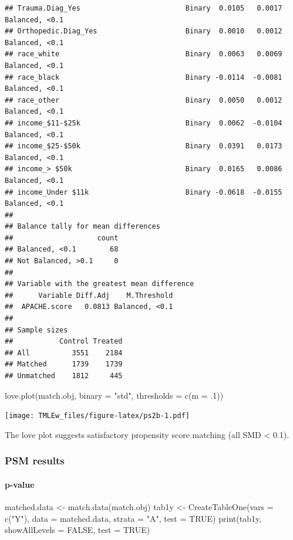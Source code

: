\documentclass[
]{book}
\newenvironment{Shaded}{\begin{snugshade}}{\end{snugshade}}
\newcommand{\AttributeTok}[1]{\textcolor[rgb]{0.77,0.63,0.00}{#1}}
\newcommand{\ConstantTok}[1]{\textcolor[rgb]{0.00,0.00,0.00}{#1}}
\newcommand{\DecValTok}[1]{\textcolor[rgb]{0.00,0.00,0.81}{#1}}
\newcommand{\FunctionTok}[1]{\textcolor[rgb]{0.00,0.00,0.00}{#1}}
\newcommand{\NormalTok}[1]{#1}
\newcommand{\OtherTok}[1]{\textcolor[rgb]{0.56,0.35,0.01}{#1}}
\newcommand{\StringTok}[1]{\textcolor[rgb]{0.31,0.60,0.02}{#1}}
\begin{document}
\begin{verbatim}
## Trauma.Diag_Yes                         Binary  0.0105   0.0017 Balanced, <0.1
## Orthopedic.Diag_Yes                     Binary  0.0010   0.0012 Balanced, <0.1
## race_white                              Binary  0.0063   0.0069 Balanced, <0.1
## race_black                              Binary -0.0114  -0.0081 Balanced, <0.1
## race_other                              Binary  0.0050   0.0012 Balanced, <0.1
## income_$11-$25k                         Binary  0.0062  -0.0104 Balanced, <0.1
## income_$25-$50k                         Binary  0.0391   0.0173 Balanced, <0.1
## income_> $50k                           Binary  0.0165   0.0086 Balanced, <0.1
## income_Under $11k                       Binary -0.0618  -0.0155 Balanced, <0.1
## 
## Balance tally for mean differences
##                    count
## Balanced, <0.1        68
## Not Balanced, >0.1     0
## 
## Variable with the greatest mean difference
##      Variable Diff.Adj    M.Threshold
##  APACHE.score   0.0813 Balanced, <0.1
## 
## Sample sizes
##           Control Treated
## All          3551    2184
## Matched      1739    1739
## Unmatched    1812     445
\end{verbatim}

\begin{Shaded}
\begin{Highlighting}[]
\FunctionTok{love.plot}\NormalTok{(match.obj, }\AttributeTok{binary =} \StringTok{"std"}\NormalTok{, }
          \AttributeTok{thresholds =} \FunctionTok{c}\NormalTok{(}\AttributeTok{m =}\NormalTok{ .}\DecValTok{1}\NormalTok{))  }
\end{Highlighting}
\end{Shaded}

\texttt{[image: TMLEw\_files/figure-latex/ps2b-1.pdf]}

The love plot suggests satisfactory propensity score matching (all SMD \textless{} 0.1).

\hypertarget{psm-results}{%
\subsubsection{PSM results}\label{psm-results}}

\hypertarget{p-value}{%
\paragraph{p-value}\label{p-value}}

\begin{Shaded}
\begin{Highlighting}[]
\NormalTok{matched.data }\OtherTok{\textless{}{-}} \FunctionTok{match.data}\NormalTok{(match.obj)   }
\NormalTok{tab1y }\OtherTok{\textless{}{-}} \FunctionTok{CreateTableOne}\NormalTok{(}\AttributeTok{vars =} \FunctionTok{c}\NormalTok{(}\StringTok{"Y"}\NormalTok{),}
               \AttributeTok{data =}\NormalTok{ matched.data, }\AttributeTok{strata =} \StringTok{"A"}\NormalTok{, }
               \AttributeTok{test =} \ConstantTok{TRUE}\NormalTok{)}
\FunctionTok{print}\NormalTok{(tab1y, }\AttributeTok{showAllLevels =} \ConstantTok{FALSE}\NormalTok{, }
      \AttributeTok{test =} \ConstantTok{TRUE}\NormalTok{)}
\end{Highlighting}
\end{Shaded}
\end{document}
